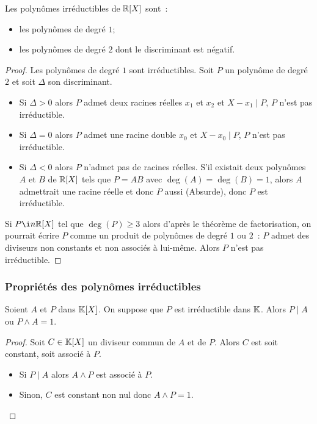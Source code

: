 \begin{prop}
  Les polynômes irréductibles de \(\mathbb{R}[X]\) sont~:
  \begin{itemize}
    \item les polynômes de degré \(1\);
    \item les polynômes de degré \(2\) dont le discriminant est négatif.
  \end{itemize}
\end{prop}
\begin{proof}
  Les polynômes de degré \(1\) sont irréductibles. Soit \(P\) un polynôme de 
  degré \(2\) et soit \(\Delta\) son discriminant.
  \begin{itemize}
    \item Si \(\Delta>0\) alors \(P\) admet deux racines réelles \(x_1\) et 
      \(x_2\) et \(X-x_1\mid{}P\), \(P\) n'est pas irréductible.
    \item Si \(\Delta = 0\) alors \(P\) admet une racine double \(x_0\) et 
      \(X-x_0\mid{}P\), \(P\) n'est pas irréductible.
    \item Si \(\Delta <0\) alors \(P\) n'admet pas de racines réelles. S'il 
      existait deux polynômes \(A\) et \(B\) de \(\mathbb{R}[X]\) tels que \(P = AB\) avec 
      \(\deg(A) = \deg(B) = 1\), alors \(A\) admettrait une racine réelle et donc 
      \(P\) aussi (Absurde), donc \(P\) est irréductible.
  \end{itemize}
  Si \(P \i n \R[X]\) tel que \(\deg(P)\geqslant 3\) alors d'après le théorème de 
  factorisation, on pourrait écrire \(P\) comme un produit de polynômes de degré 
  \(1\) ou \(2\)~: \(P\) admet des diviseurs non constants et non associés à 
  lui-même. Alors \(P\) n'est pas irréductible.
\end{proof}

\subsubsection{Propriétés des polynômes irréductibles}

\begin{prop}
  Soient \(A\) et \(P\) dans \(\mathbb{K}[X]\). On suppose que \(P\) est irréductible 
  dans \(\mathbb{K}\). Alors \(P\mid{}A\) ou \(P \wedge A = 1\).
\end{prop}
\begin{proof}
  Soit \(C \in \mathbb{K}[X]\) un diviseur commun de \(A\) et de \(P\). Alors \(C\) est 
  soit constant, soit associé à \(P\).
  \begin{itemize}
    \item Si \(P\mid{}A\) alors \(A\wedge P\) est associé à \(P\).
    \item Sinon, \(C\) est constant non nul donc \(A \wedge P = 1\).
  \end{itemize}
\end{proof}

